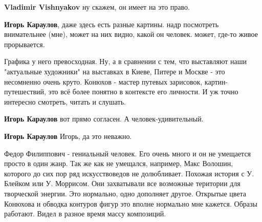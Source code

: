 \begin{itemize}
\begin{itemize}
\textbf{Vladimir Vishnyakov} ну скажем, он имеет на это право.

\textbf{Игорь Караулов}, даже здесь есть разные картины. надр посмотреть внимательнее (мне), может на них видно, какой он человек. может, где-то живое прорывается.


Графика у него превосходная. Ну, а в сравнении с тем, что выставляют наши
"актуальные художники" на выставках в Киеве, Питере и Москве - это несомненно
очень круто. Конюхов - мастер путевых зарисовок, картин-путешествий, это всё
более понятно в контексте его личности. И уж точно интересно смотреть, читать и
слушать.

\textbf{Игорь Караулов} вот прямо согласен. А человек-удивительный.

\textbf{Игорь Караулов} Игорь, да это неважно.


Федор Филиппович - гениальный человек. Его очень много и он не умещается просто
в один жанр. Так же как не умещался, например, Макс Волошин, которого до сих
пор ряд искусствоведов не долюбливает. Похожая история с У. Блейком или У.
Моррисом. Они захватывали все возможные територии для творческой энергии. Это
нормально, одно дополняет другое. Открытые цвета Конюхова и обводка контуров
фигур это вполне нормально мне кажется. Образы работают. Видел в разное время
массу композиций.

\end{itemize} %


\end{itemize} %
